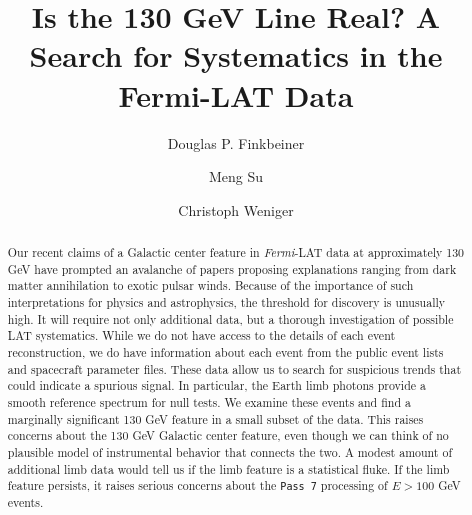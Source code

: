 \documentclass[aps,twocolumn,prd,superscriptaddress,showpacs,nofootinbib,fixfloat]{revtex4}
\newcommand{\Fermi}{{\slshape Fermi}}
\begin{document}
\title{Is the 130 GeV Line Real? 
  A Search for Systematics in the Fermi-LAT Data}

\author{Douglas P. Finkbeiner}

\author{Meng Su}

\author{Christoph Weniger}

\begin{abstract} Our recent claims of a Galactic center
  feature in \Fermi-LAT data at approximately 130 GeV have
  prompted an avalanche of papers proposing explanations
  ranging from dark matter annihilation to exotic pulsar
  winds.  Because of the importance of such interpretations
  for physics and astrophysics, the threshold for discovery
  is unusually high.  It will require not only additional
  data, but a thorough investigation of possible LAT
  systematics.  While we do not have access to the details
  of each event reconstruction, we do have information about
  each event from the public event lists and spacecraft
  parameter files.  These data allow us to search for
  suspicious trends that could indicate a spurious signal.
  In particular, the Earth limb photons provide a smooth
  reference spectrum for null tests.  We examine these
  events and find a marginally significant 130 GeV feature
  in a small subset of the data.  This raises concerns about
  the 130 GeV Galactic center feature, even though we can
  think of no plausible model of instrumental behavior that
  connects the two.  A modest amount of additional limb data
  would tell us if the limb feature is a statistical fluke.
  If the limb feature persists, it raises serious concerns
  about the \texttt{Pass 7} processing of $E > 100$ GeV events.
\end{abstract}


\maketitle
\end{document}
